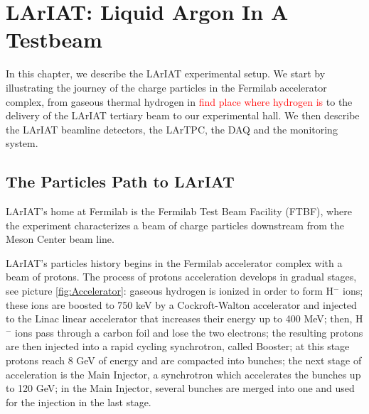 \chapter{LArIAT: Liquid Argon In A Testbeam}\label{sec:experimentDescription}
In this chapter, we describe the LArIAT experimental setup. We start by illustrating the journey of the charge particles in the Fermilab accelerator complex, from gaseous thermal hydrogen in \textcolor{red}{find place where hydrogen is} to the delivery of the LArIAT tertiary beam to our experimental hall. We  then describe the LArIAT beamline detectors, the LArTPC, the DAQ and the monitoring system.

\section{The Particles Path to LArIAT}

LArIAT's home at Fermilab is the Fermilab Test Beam Facility (FTBF), where the experiment characterizes a beam of charge particles downstream from the Meson Center beam line. 

LArIAT's particles history begins in the Fermilab accelerator complex with a beam of protons. The process of protons acceleration develops in gradual stages, see picture \ref{fig:Accelerator}: gaseous hydrogen is ionized in order to form H$^{-}$ ions; these ions are boosted to 750 keV by a Cockroft-Walton accelerator and injected to the Linac linear accelerator that increases their energy up to 400 MeV; then, H$^{-}$ ions pass through a carbon foil and lose the two electrons; the resulting protons are then injected into a rapid cycling synchrotron, called Booster; at this stage protons reach 8 GeV of energy and are compacted into bunches; the next stage of acceleration is the Main Injector, a synchrotron which accelerates the bunches up to 120 GeV; in the Main Injector, several bunches are merged into one and used for the injection in the last stage.


